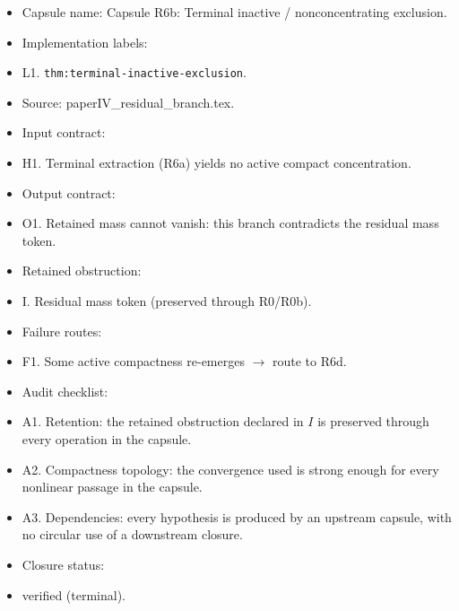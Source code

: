 \documentclass[11pt]{amsart}
\begin{document}
\begin{itemize}
  \item Capsule name: Capsule R6b: Terminal inactive / nonconcentrating exclusion.
  \item Implementation labels:
  \item L1. \texttt{thm:terminal-inactive-exclusion}.
  \item Source: paperIV\_residual\_branch.tex.
  \item Input contract:
  \item H1. Terminal extraction (R6a) yields no active compact concentration.
  \item Output contract:
  \item O1. Retained mass cannot vanish: this branch contradicts the residual mass token.
  \item Retained obstruction:
  \item I. Residual mass token (preserved through R0/R0b).
  \item Failure routes:
  \item F1. Some active compactness re-emerges $\to$ route to R6d.
  \item Audit checklist:
  \item A1. Retention: the retained obstruction declared in $I$ is preserved through every operation in the capsule.
  \item A2. Compactness topology: the convergence used is strong enough for every nonlinear passage in the capsule.
  \item A3. Dependencies: every hypothesis is produced by an upstream capsule, with no circular use of a downstream closure.
  \item Closure status:
  \item verified (terminal).
\end{itemize}
\end{document}

